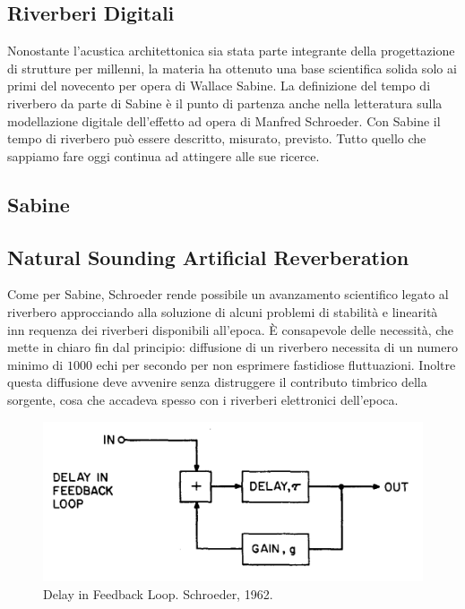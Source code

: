 
\begin{refsection}

\section{Riverberi Digitali}
\thispagestyle{empty}

Nonostante l'acustica architettonica sia stata parte integrante della
progettazione di strutture per millenni, la materia ha ottenuto una base
scientifica solida solo ai primi del novecento per opera di Wallace Sabine.
La definizione del tempo di riverbero da parte di Sabine è il punto di partenza
anche nella letteratura sulla modellazione digitale dell'effetto ad opera di
Manfred Schroeder. Con Sabine il tempo di riverbero può essere descritto,
misurato, previsto. Tutto quello che sappiamo fare oggi continua ad attingere
alle sue ricerce.

\subsection{Sabine}

\subsection{Natural Sounding Artificial Reverberation}


Come per Sabine, Schroeder rende possibile un avanzamento scientifico legato
al riverbero approcciando alla soluzione di alcuni problemi di stabilità e
linearità inn requenza dei riverberi disponibili all'epoca. È consapevole delle
necessità, che mette in chiaro fin dal principio: diffusione di un riverbero
necessita di un numero minimo di $1000$ echi per secondo per non esprimere fastidiose
fluttuazioni. Inoltre questa diffusione deve avvenire senza distruggere il
contributo timbrico della sorgente, cosa che accadeva spesso con i riverberi
elettronici dell'epoca.

\begin{figure}[hb]
  \centering
  \includegraphics[width=\textwidth]{CAPITOLI/0500/IMG/dfl.png}
  \caption[]{Delay in Feedback Loop. Schroeder, 1962.}
  \label{schroeder:dfl}
\end{figure}


\end{refsection}
